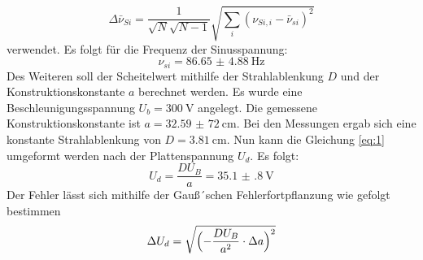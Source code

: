 \begin{equation*}
  \Delta \bar{\nu}_{Si} = \frac{1}{\sqrt{N}\sqrt{N-1}} \sqrt{\sum_{i}(\nu_{Si,i}-\bar{\nu}_{si})^2}
\end{equation*}
verwendet.
Es folgt für die Frequenz der Sinusspannung:
\begin{equation*}
  \nu_{si}= \SI{86.65(488)}{\hertz}
\end{equation*}
Des Weiteren soll der Scheitelwert mithilfe der Strahlablenkung $D$ und der Konstruktionskonstante $a$ berechnet werden.
Es wurde eine Beschleunigungsspannung $U_b = \SI{300}{\volt}$ angelegt. Die gemessene Konstruktionskonstante ist
$a = \SI{32,59(72)}{\centi\meter}$.
Bei den Messungen ergab sich eine konstante Strahlablenkung von $D = \SI{3.81}{\centi\meter}$.
Nun kann die Gleichung \ref{eq:1} umgeformt werden nach  der Plattenspannung $U_d$.
Es folgt:
\begin{equation*}
  U_d = \frac{D U_B}{a} = \SI{35.1(8)}{\volt}
\end{equation*}
Der Fehler lässt sich mithilfe der Gauß´schen Fehlerfortpflanzung wie gefolgt bestimmen
\begin{equation}
  \Delta U_d = \sqrt{\Bigl(-\frac{DU_B}{a^2}\cdot \Delta a\Bigr)^2}
\end{equation}
